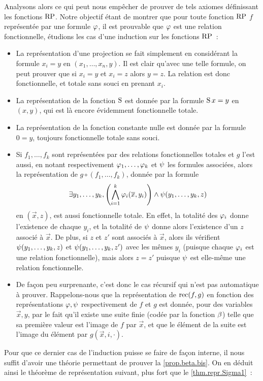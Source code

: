 Analysons alors ce qui peut nous empêcher de prouver de tels axiomes définissant
les fonctions $\operatorname{RP}$. Notre objectif étant de montrer que pour toute fonction
$\operatorname{RP}$ $f$ représentée par une formule $\varphi$, il est prouvable que $\varphi$
est une relation fonctionnelle, étudions les cas d'une induction sur les
fonctions $\operatorname{RP}$~:
\begin{itemize}
\item La représentation d'une projection se fait simplement en considérant la
  formule $x_i = y$ en $(x_1,\ldots,x_n,y)$. Il est clair qu'avec une telle
  formule, on peut prouver que si $x_i = y$ et $x_i = z$ alors $y = z$. La
  relation est donc fonctionnelle, et totale sans souci en prenant $x_i$.
\item La représentation de la fonction $\operatorname{S}$ est donnée par la formule
  $\operatorname{S} x = y$ en $(x,y)$, qui est là encore évidemment fonctionnelle totale.
\item La représentation de la fonction constante nulle est donnée par la
  formule $0 = y$, toujours fonctionnelle totale sans souci.
\item Si $f_1,\ldots,f_k$ sont représentées par des relations fonctionnelles
  totales et $g$ l'est aussi, en notant respectivement
  $\varphi_1,\ldots,\varphi_k$ et $\psi$ les formules associées, alors la
  représentation de $g\circ(f_1,\ldots,f_k)$, donnée par la formule
  \[\exists y_1,\ldots,y_k,
  \left(\bigwedge_{i = 1}^k \varphi_i(\overline{x}, y_i)\right) \land
  \psi(y_1,\ldots,y_k,z)\]
  en $(\vec x, z)$, est aussi fonctionnelle totale. En effet, la totalité des
  $\varphi_i$ donne l'existence de chaque $y_i$, et la totalité de $\psi$
  donne alors l'existence d'un $z$ associé à $\vec x$. De plus, si
  $z$ et $z'$ sont associés à $\vec x$, alors ils vérifient
  $\psi(y_1,\ldots,y_k,z)$ et $\psi(y_1,\ldots,y_k,z')$ avec les mêmes
  $y_i$ (puisque chaque $\varphi_i$ est une relation fonctionnelle), mais
  alors $z = z'$ puisque $\psi$ est elle-même une relation fonctionnelle.
\item De façon peu surprenante, c'est donc le cas récursif qui n'est pas
  automatique à prouver. Rappelons-nous que la représentation de $\operatorname{rec}(f,g)$ en
  fonction des représentations $\varphi, \psi$ respectivement de $f$ et $g$ est
  donnée, pour des variables $\vec x, y$, par le fait qu'il existe une suite
  finie (codée par la fonction $\beta$) telle que sa première valeur est l'image
  de $f$ par $\vec x$, et que le  élément de la suite
  est l'image du  élément par $g(\vec x,i,\cdot)$.
\end{itemize}
Pour que ce dernier cas de l'induction puisse se faire de façon interne, il nous
suffit d'avoir une théorie permettant de prouver la \cref{prop.beta.bis}. On en
déduit ainsi le théorème de représentation suivant, plus fort que le
\cref{thm.repr.Sigma1}~:

